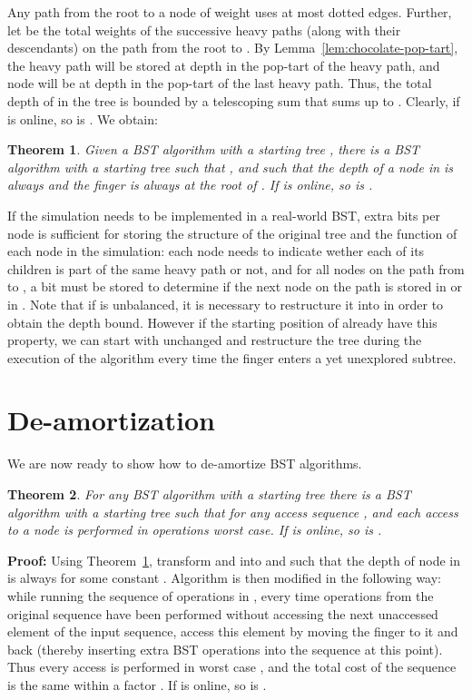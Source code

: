 \documentclass[11pt]{article}
\newtheorem{theorem}{Theorem}
\newenvironment{proof}{\noindent\textbf{Proof: }\ignorespaces}
  {\hspace*{\fill}\medskip}
\begin{document}
Any path from the root to a node  of weight  uses at most 
dotted edges. Further, let  be the total weights of
the successive heavy paths (along with their descendants) on the path from
the root to . By Lemma~\ref{lem:chocolate-pop-tart}, the  heavy
path will be stored at depth  in the pop-tart of the
 heavy path, and node  will be at depth 
in the pop-tart of the last heavy path.  Thus, the total depth of  in
the tree is bounded by a telescoping sum that sums up to .
Clearly, if  is online, so is . We obtain:

\begin{theorem}\label{thm:simulation}
Given a BST algorithm  with a starting tree , there is a BST
algorithm  with a starting tree  such that ,
and such that the depth of a node  in  is always 
and the finger is always at the root of . If  is online, so is
.
\end{theorem}

If the simulation needs to be implemented in a real-world BST,  extra
bits per node is sufficient for storing the structure of
the original tree and the function of each node in the simulation:
each node needs to indicate wether each of its 
children is part of the same heavy path or not, and for all nodes on
the path from  to , a bit must be stored to determine if the
next node on the path is stored in  or in .
Note that if  is unbalanced, it is necessary to restructure it into
 in order to obtain the depth bound. However if the starting
position of  already have this property, we can start with
 unchanged and restructure the tree
during the execution of the algorithm every time the finger enters a
yet unexplored subtree.

\section{De-amortization}\label{sec:de-amortization}
We are now ready to show how to de-amortize BST algorithms.

\begin{theorem}\label{thm:offline}
For any BST algorithm  with a starting tree  there is a BST
algorithm  with a starting tree  such that for any access
sequence ,  and each access to a node is
performed in  operations worst case. If  is online, so is .
\end{theorem}
\begin{proof}
Using Theorem~\ref{thm:simulation}, transform  and  into  and
 such that the depth of node  in  is always  for some
constant .  Algorithm  is then modified in the following way: while
running the sequence of operations in , every time 
operations from the original  sequence have been performed without accessing the next unaccessed
element of the input sequence, access this element by moving the finger to it
and back (thereby inserting  extra BST operations into the sequence at this point).
Thus every access is performed in worst case , and the total cost of the sequence is
the same within a factor . If  is online, so is .
\end{proof}
\end{document}
